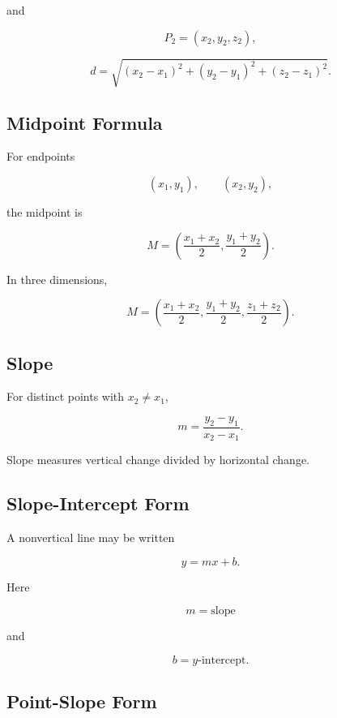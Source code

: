 and

\[
P_2=(x_2,y_2,z_2),
\]

\[
\boxed{
d
=
\sqrt{
(x_2-x_1)^2
+
(y_2-y_1)^2
+
(z_2-z_1)^2
}.
}
\]

\subsection{Midpoint Formula}
\label{subsec:midpoint-formula-reference}

For endpoints

\[
(x_1,y_1),
\qquad
(x_2,y_2),
\]

the midpoint is

\[
\boxed{
M
=
\left(
\frac{x_1+x_2}{2},
\frac{y_1+y_2}{2}
\right).
}
\]

In three dimensions,

\[
\boxed{
M
=
\left(
\frac{x_1+x_2}{2},
\frac{y_1+y_2}{2},
\frac{z_1+z_2}{2}
\right).
}
\]

\subsection{Slope}
\label{subsec:slope-reference}

For distinct points with \(x_2\neq x_1\),

\[
\boxed{
m
=
\frac{
y_2-y_1
}{
x_2-x_1
}.
}
\]

Slope measures vertical change divided by horizontal change.

\subsection{Slope-Intercept Form}
\label{subsec:slope-intercept-reference}

A nonvertical line may be written

\[
\boxed{
y=mx+b.
}
\]

Here

\[
m
=
\text{slope}
\]

and

\[
b
=
\text{\(y\)-intercept}.
\]

\subsection{Point-Slope Form}
\label{subsec:point-slope-reference}

